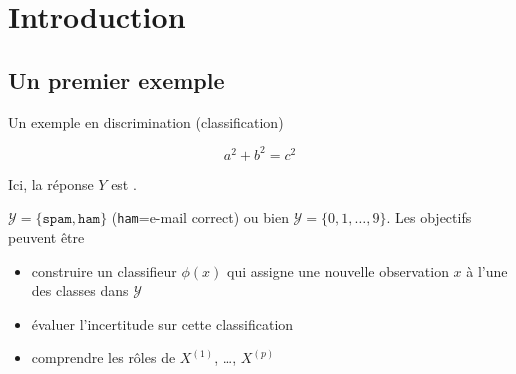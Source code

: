 \documentclass[unknownkeysallowed]{beamer}
\begin{document}
\section{Introduction}
\label{sec:introdcution}

\subsection{Un premier exemple}
\label{sub:un_premier_exemple}

\begin{frame}{Un exemple en discrimination (classification)}

{
\begin{equation*}
a^2 + b^2 = c^2
\end{equation*}
}

\vspace{1cm}

Ici, la réponse $Y$ est .

\exemple
$\mathcal{Y} = \{\texttt{spam},  \texttt{ham}\}$
(\texttt{ham}=e-mail correct) ou bien
$\mathcal{Y}= \{0, 1, \dots,9\}$. Les objectifs peuvent être
\begin{itemize}
	\item construire un classifieur $\phi(x)$ qui assigne une nouvelle
	observation $x$ à l'une des classes dans $\mathcal{Y}$
	\item évaluer l'incertitude sur cette classification 
	\item comprendre les rôles de $X^{(1)}$, \dots, $X^{(p)}$
\end{itemize}


\end{frame}
\end{document}
